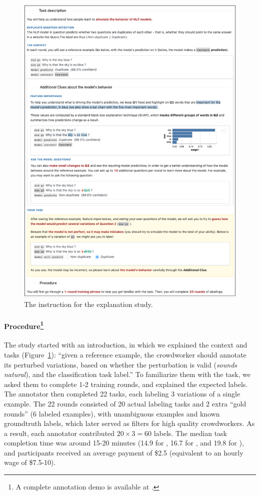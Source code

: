 \begin{figure}
\centering
\includegraphics[width=1\textwidth]{figures/explanation_instruction}
\vspace{-15pt}
\caption{The instruction for the explanation study.}
\vspace{-10pt}
\label{fig:mturk_instruction_detail}

\end{figure}
\paragraph{Procedure\footnote{A complete annotation demo is available at \mturkurl.}}
The study started with an introduction, in which we explained the context and tasks (Figure~\ref{fig:mturk_instruction_detail}): 
``given a reference example, the crowdworker should annotate its perturbed variations, based on whether the perturbation is valid (\emph{sounds natural}), and the classification task label.''
To familiarize them with the task, we asked them to complete 1-2 training rounds, and explained the expected labels.
The annotator then completed 22 tasks, each labeling 3 variations of a single example.
The 22 rounds consisted of 20 actual labeling tasks and 2 extra ``gold rounds'' (6 labeled examples), with unambiguous examples and known groundtruth labels, which later served as filters for high quality crowdworkers.
As a result, each annotator contributed $20 \times 3=60$ labels.
The median task completion time was around 15-20 minutes (14.9 for \qqp, 16.7 for \sst, and 19.8 for \nli), and participants received an average payment of \$2.5 (equivalent to an hourly wage of \$7.5-10).

